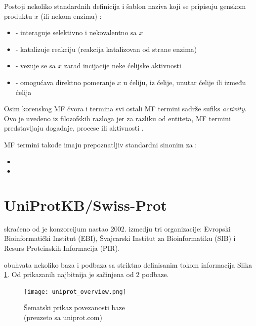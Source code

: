 Postoji nekoliko standardnih definicija i šablon naziva koji se pripisuju genskom
produktu $x$ (ili nekom enzimu) \parencite{go_mf}:
\begin{itemize}
  \item {} - interaguje selektivno i nekovalentno sa $x$
  \item {} - katalizuje reakciju (reakcija katalizovan od strane enzima)
  \item {} - vezuje se sa $x$ zarad incijacije neke ćelijske aktivnosti
  \item {} - omogućava direktno pomeranje $x$ u ćeliju, iz ćelije, unutar ćelije ili između ćelija
\end{itemize}

Osim korenskog MF čvora i  termina svi ostali MF termini sadrže sufiks \textit{activity}.
Ovo je uvedeno iz filozofskih razloga jer za razliku od entiteta, MF termini predstavljaju događaje, procese ili aktivnosti \parencite{go_mf}.

MF termini takođe imaju prepoznatljiv standardni sinonim za  \parencite{go_mf}:
\begin{itemize}
  \item {}
  \item {}
\end{itemize}


\section{UniProtKB/Swiss-Prot}
\label{svis-prot}

\keyword{\uniprot} skraćeno od  je konzorcijum
nastao 2002. izmedju tri organizacije: Evropski Bioinformatički
Institut (EBI), Švajcarski Institut za Bioinformatiku (SIB) i Resurs
Proteinskih Informacija (PIR).  


\uniprot obuhvata nekoliko baza i podbaza sa striktno definisanim tokom
informacija Slika \ref{fig:uniprot_overview}. Od prikazanih najbitnija je
\keyword{\uniprotkb}  sačinjena od 2 podbaze.

\begin{figure}[h!]
  \centering
  \texttt{[image: uniprot\_overview.png]}
  \caption{Šematski prikaz povezanosti \uniprot baze\\ \footnotesize (preuzeto sa uniprot.com)}
  \label{fig:uniprot_overview}
\end{figure}



